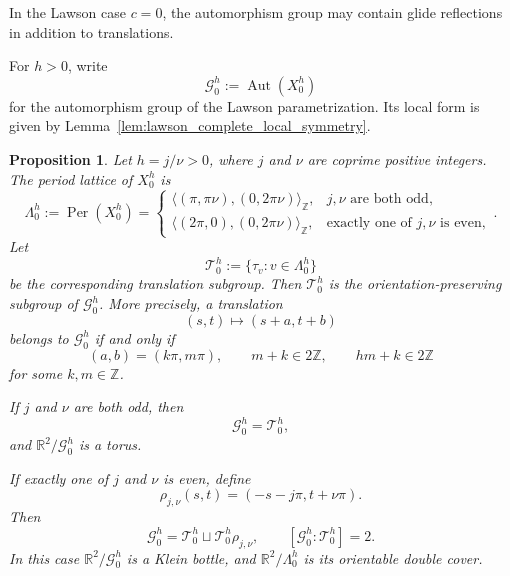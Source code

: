 \documentclass[a4paper,11pt]{amsart}
\numberwithin{equation}{section}
\theoremstyle{plain}
\newtheorem{prop}[thm]{Proposition}
\begin{document}
In the Lawson case $c=0$, the automorphism group may contain glide reflections
in addition to translations.

For $h>0$, write
\begin{equation}\label{eq:lawson_automorphism_group}
\mathcal G_0^h:=\operatorname{Aut}(X_0^h)
\end{equation}
for the automorphism group of the Lawson parametrization. Its local form is
given by Lemma~\ref{lem:lawson_complete_local_symmetry}.

\begin{prop}
\label{prop:lawson_complete_symmetry_group}
Let $h=j/\nu>0$, where $j$ and $\nu$ are coprime positive integers. The period lattice of $X_0^h$ is
\begin{equation}\label{eq:lawson_translation_lattice}
\Lambda_0^h
:=
\operatorname{Per}(X_0^h)
=
\begin{cases}
\langle(\pi,\pi\nu),(0,2\pi\nu)\rangle_{\mathbb Z},
& j,\nu \text{ are both odd},\\[1mm]
\langle(2\pi,0),(0,2\pi\nu)\rangle_{\mathbb Z},
& \text{exactly one of $j,\nu$ is even},
\end{cases}.
\end{equation}
Let
\begin{equation}\label{eq:lawson_translation_subgroup}
\mathcal T_0^h
:=
\{\tau_v:v\in\Lambda_0^h\}
\end{equation}
be the corresponding translation subgroup. Then $\mathcal T_0^h$ is the
orientation-preserving subgroup of
$\mathcal G_0^h$. More precisely, a translation
\[
(s,t)\longmapsto(s+a,t+b)
\]
belongs to $\mathcal G_0^h$ if and only if
\begin{equation}\label{eq:lawson_translation_period_conditions}
(a,b)=(k\pi,m\pi),
\qquad
m+k\in2\mathbb Z,
\qquad
hm+k\in2\mathbb Z
\end{equation}
for some $k,m\in\mathbb Z$.

If $j$ and $\nu$ are both odd, then
\begin{equation}\label{eq:lawson_group_odd_odd}
\mathcal G_0^h=\mathcal T_0^h,
\end{equation}
and $\mathbb R^2/\mathcal G_0^h$ is a torus.

If exactly one of $j$ and $\nu$ is even, define
\begin{equation}\label{eq:lawson_glide_reflection}
\rho_{j,\nu}(s,t)=(-s-j\pi,t+\nu\pi).
\end{equation}
Then
\begin{equation}\label{eq:lawson_group_mixed_parity}
\mathcal G_0^h
=
\mathcal T_0^h
\sqcup
\mathcal T_0^h\rho_{j,\nu},
\qquad
[\mathcal G_0^h:\mathcal T_0^h]=2.
\end{equation}
In this case $\mathbb R^2/\mathcal G_0^h$ is a Klein bottle, and
$\mathbb R^2/\Lambda_0^h$ is its orientable double
cover.
\end{prop}
\end{document}
